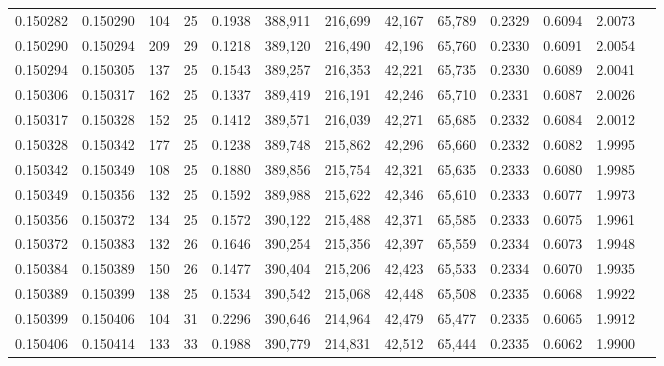 \begin{tabular}{rrrrrrrrrrrrr}
0.150282 & 0.150290 & 104 &  25 &                                     0.1938 & 388,911 & 216,699 &  42,167 &  65,789 & 0.2329 & 0.6094 & 2.0073 \\
0.150290 & 0.150294 & 209 &  29 &                                     0.1218 & 389,120 & 216,490 &  42,196 &  65,760 & 0.2330 & 0.6091 & 2.0054 \\
0.150294 & 0.150305 & 137 &  25 &                                     0.1543 & 389,257 & 216,353 &  42,221 &  65,735 & 0.2330 & 0.6089 & 2.0041 \\
0.150306 & 0.150317 & 162 &  25 &                                     0.1337 & 389,419 & 216,191 &  42,246 &  65,710 & 0.2331 & 0.6087 & 2.0026 \\
0.150317 & 0.150328 & 152 &  25 &                                     0.1412 & 389,571 & 216,039 &  42,271 &  65,685 & 0.2332 & 0.6084 & 2.0012 \\
0.150328 & 0.150342 & 177 &  25 &                                     0.1238 & 389,748 & 215,862 &  42,296 &  65,660 & 0.2332 & 0.6082 & 1.9995 \\
0.150342 & 0.150349 & 108 &  25 &                                     0.1880 & 389,856 & 215,754 &  42,321 &  65,635 & 0.2333 & 0.6080 & 1.9985 \\
0.150349 & 0.150356 & 132 &  25 &                                     0.1592 & 389,988 & 215,622 &  42,346 &  65,610 & 0.2333 & 0.6077 & 1.9973 \\
0.150356 & 0.150372 & 134 &  25 &                                     0.1572 & 390,122 & 215,488 &  42,371 &  65,585 & 0.2333 & 0.6075 & 1.9961 \\
0.150372 & 0.150383 & 132 &  26 &                                     0.1646 & 390,254 & 215,356 &  42,397 &  65,559 & 0.2334 & 0.6073 & 1.9948 \\
0.150384 & 0.150389 & 150 &  26 &                                     0.1477 & 390,404 & 215,206 &  42,423 &  65,533 & 0.2334 & 0.6070 & 1.9935 \\
0.150389 & 0.150399 & 138 &  25 &                                     0.1534 & 390,542 & 215,068 &  42,448 &  65,508 & 0.2335 & 0.6068 & 1.9922 \\
0.150399 & 0.150406 & 104 &  31 &                                     0.2296 & 390,646 & 214,964 &  42,479 &  65,477 & 0.2335 & 0.6065 & 1.9912 \\
0.150406 & 0.150414 & 133 &  33 &                                     0.1988 & 390,779 & 214,831 &  42,512 &  65,444 & 0.2335 & 0.6062 & 1.9900 \\

\end{tabular}
